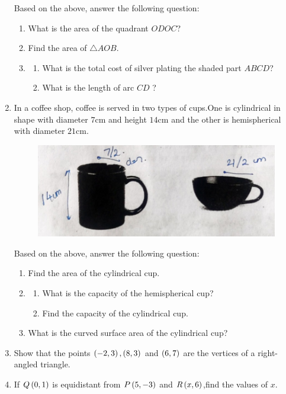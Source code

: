 \begin{enumerate}
	\text Based on the above, answer the following question:
		\begin{enumerate}
			\item What is the area of the quadrant $ODOC$?
			\item Find the area of $\triangle AOB$.
			\item
			\begin{enumerate}
				\item What is the total cost of silver plating the shaded part $ABCD$?
				\item What is the length of arc $CD$ ?
			\end{enumerate}
		\end{enumerate}
\newpage
\item In a coffee shop, coffee is served in two types of cups.One is cylindrical  in shape with diameter $7 \mathrm{cm}$ and height $14 \mathrm{cm} $ and the other is hemispherical with diameter $21 \mathrm{cm}$.

	
	\begin{figure}[!ht]
		\centering
		\includegraphics[width=\columnwidth]{figs/last2.jpg}
		\caption{}
		\label{fig:enter-label}
	\end{figure}

	\text Based on the above, answer the following question:
	\begin{enumerate}
		\item  Find the area of the cylindrical cup.
		\item
		\begin{enumerate}
			\item  What is the capacity of the hemispherical cup?
			\item Find the capacity of the cylindrical cup.
		\end{enumerate}
		\item   What is the curved surface area of the cylindrical cup?
         \end{enumerate}

\newpage	
\item Show that the points $\left(-2,3\right), \left(8,3\right)$ and $\left(6,7\right) $ are the vertices of a right-angled triangle.

\item If $Q\left(0,1\right)$ is equidistant from $P\left(5,-3\right)$ and $R\left(x,6\right)$,find the values of $x$.


\end{enumerate}

